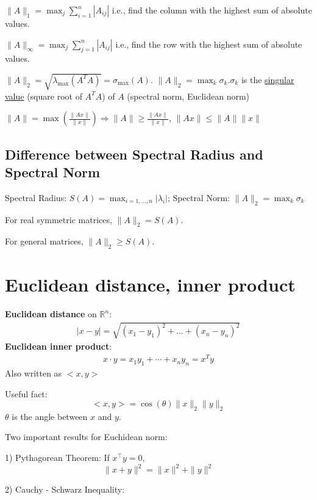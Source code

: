 \documentclass[11pt]{elegantbook}
\begin{document}
$\|A\|_{1}=\max _{j} \sum_{i=1}^{n}\left|A_{i j}\right|$ i.e., find the column with the highest sum of absolute values.

$\|A\|_{\infty}=\max _{j} \sum_{j=1}^{n}\left|A_{i j}\right|$ i.e., find the row with the highest sum of absolute values.

${\displaystyle \|A\|_{2}={\sqrt {\lambda _{\max }\left(A^{T}A\right)}}=\sigma _{\max }(A).}$
$\|A\|_{2}=\max _{k} \sigma_{k}. \sigma_{k}$ is the \underline{singular value} (square root of $A^TA$) of $A$ (spectral norm, Euclidean norm)

$\|A\|=\max \left(\frac{\|A x\|}{\|x\|}\right) \Rightarrow\|A\| \geqslant \frac{\|A x\|}{\|x\|}$, $\|Ax\| \leqslant\|A\|\|x\|$

\subsection{Difference between Spectral Radius and Spectral Norm}
Spectral Radius: $S(A)=\max_{i=1,...,n}|\lambda_i|$; Spectral Norm: $\|A\|_{2}=\max _{k} \sigma_{k}$

For real symmetric matrices, $\|A\|_2=S(A)$.

For general matrices, $\|A\|_2\geq S(A)$.

\section{ Euclidean distance, inner product}
\textbf{Euclidean distance} on $\mathbb{R}^n$:
\begin{equation}
    \begin{aligned}
        |x-y|=\sqrt{(x_1-y_1)^2+...+(x_n-y_n)^2}
    \end{aligned}
    \nonumber
\end{equation}
\textbf{Euclidean inner product}:
\begin{equation}
    \begin{aligned}
        x\cdot y=x_1y_1+\cdots +x_ny_n=x^Ty
    \end{aligned}
    \nonumber
\end{equation}
Also written as $<x,y>$

Useful fact: $$<x,y>=\cos(\theta)\|x\|_2\|y\|_2$$
$\theta$ is the angle between $x$ and $y$.

Two important results for Euchidean norm:

1) Pythagorean Theorem: If $x^{\top} y=0$,
\[ \|x+y\|^{2}=\|x\|^{2}+\|y\|^{2} \]

2) Cauchy - Schwarz Inequality:
\end{document}
